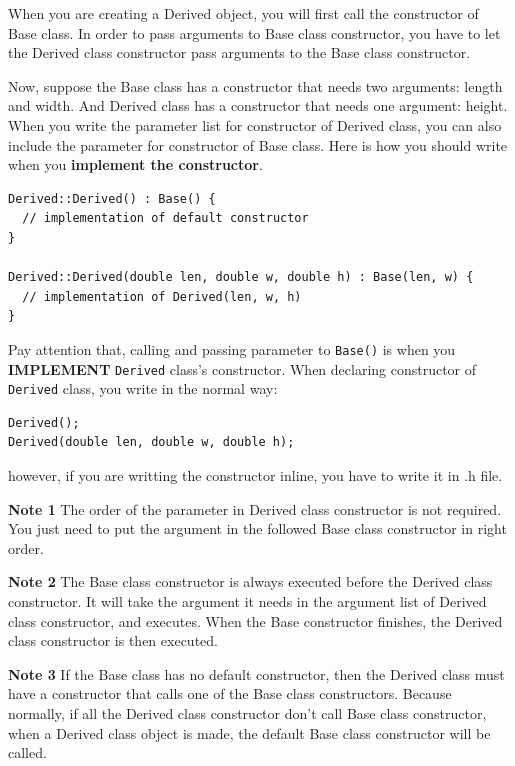 \documentclass[12pt]{book}
\begin{document}
When you are creating a Derived object, you will first call the constructor of Base class. In order to pass arguments to Base class constructor, you have to let the Derived class constructor pass arguments to the Base class constructor.

Now, suppose the Base class has a constructor that needs two arguments: length and width. And Derived class has a constructor that needs one argument: height. When you write the parameter list for constructor of Derived class, you can also include the parameter for constructor of Base class. Here is how you should write when you \textbf{implement the constructor}.
\begin{verbatim}
Derived::Derived() : Base() {
  // implementation of default constructor 
}

Derived::Derived(double len, double w, double h) : Base(len, w) {
  // implementation of Derived(len, w, h)
}
\end{verbatim}

Pay attention that, calling and passing parameter to \texttt{Base()} is when you \textbf{IMPLEMENT} \texttt{Derived} class's constructor. When declaring constructor of \texttt{Derived} class, you write in the normal way:
\begin{verbatim}
Derived();
Derived(double len, double w, double h);
\end{verbatim}
however, if you are writting the constructor inline, you have to write it in .h file.

\textbf{Note 1} 
The order of the parameter in Derived class constructor is not required. You just need to put the argument in the followed Base class constructor in right order.

\textbf{Note 2} 
The Base class constructor is always executed before the Derived class constructor. It will take the argument it needs in the argument list of Derived class constructor, and executes. When the Base constructor finishes, the Derived class constructor is then executed.

\textbf{Note 3}
If the Base class has no default constructor, then the Derived class must have a constructor that calls one of the Base class constructors. Because normally, if all the Derived class constructor don't call Base class constructor, when a Derived  class object is made, the default Base class constructor will be called.
\end{document}
